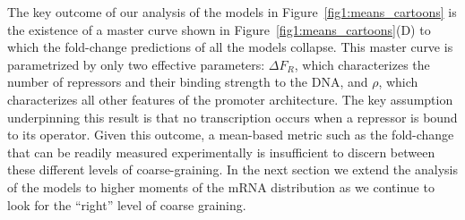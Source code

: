 The key outcome of our analysis of the models in
Figure~\ref{fig1:means_cartoons} is the existence of a master curve shown
in Figure~\ref{fig1:means_cartoons}(D) to which the fold-change predictions
of all the models collapse. This master curve is parametrized by only two
effective parameters: $\Delta F_R$, which characterizes the number of repressors
and their binding strength to the DNA, and $\rho$, which characterizes all other
features of the promoter architecture. The key assumption underpinning this
result is that no transcription occurs when a repressor is bound to its
operator. Given this outcome, a mean-based metric such as the fold-change that
can be readily measured experimentally is insufficient to discern between these
different levels of coarse-graining. In the next section we extend the analysis
of the models to higher moments of the mRNA distribution as we continue to look
for the ``right'' level of coarse graining.











